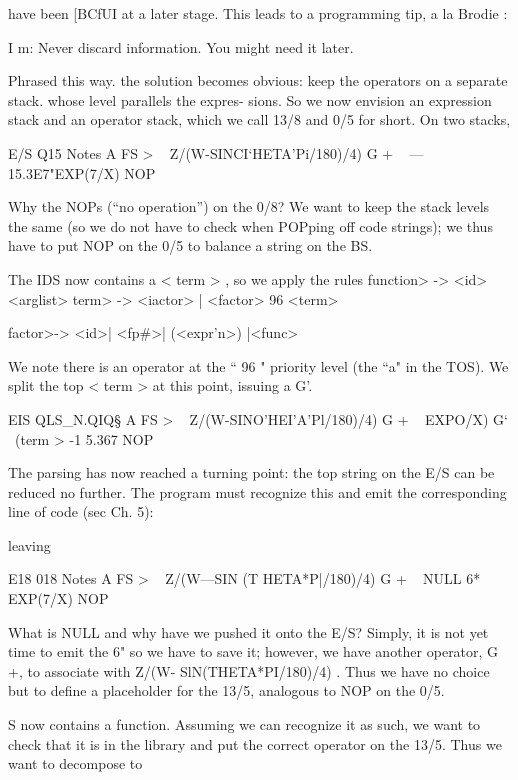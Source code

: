 have been [BCfUI at a later stage. This leads to a programming tip,
a la Brodie :

I m: Never discard information. You might need it later.

Phrased this way. the solution becomes obvious: keep the
operators on a separate stack. whose level parallels the expres-
sions. So we now envision an expression stack and an operator
stack, which we call 13/8 and 0/5 for short. On two stacks,

 

E/S Q15 Notes
A FS > \ < subject >
Z/(W-SINCI‘HETA'Pi/180)/4) G + \ < term >
—15.3E7"EXP(7/X) NOP \ < term >

Why the NOPs (“no operation”) on the 0/8? We want to keep
the stack levels the same (so we do not have to check when
POPping off code strings); we thus have to put NOP on the 0/5
to balance a string on the BS.

The IDS now contains a < term > , so we apply the rules
\<function> -> <id> <arglist>
\<term> -> <iactor> | <factor> 96 <term>

\<factor>-> <id>| <fp#>| (<expr’n>) |<func>

We note there is an operator at the “ 96 " priority level (the “a"
in the TOS). We split the top < term > at this point, issuing a G'.

 

EIS QLS_N.QIQ§
A FS > \ < subject >
Z/(W-SINO’HEI'A'Pl/180)/4) G + \ < term >
EXPO/X) G‘ \ (term >
-1 5.367 NOP


The parsing has now reached a turning point: the top string on
the E/S can be reduced no further. The program must recognize
this and emit the corresponding line of code (sec Ch. 5):


 

leaving

E18 018 Notes
A FS > \ < subject >
Z/(W—SIN (T HETA*P|/180)/4) G + \ < term >
NULL 6*
EXP(7/X) NOP \ < function >

What is NULL and why have we pushed it onto the E/S? Simply,
it is not yet time to emit the 6" so we have to save it; however,
we have another operator, G +, to associate with Z/(W-
SlN(THETA*PI/180)/4) . Thus we have no choice but to define a
placeholder for the 13/5, analogous to NOP on the 0/5.

S now contains a function. Assuming we can recognize it as
such, we want to check that it is in the library and put the
correct operator on the 13/5. Thus we want to decompose to

